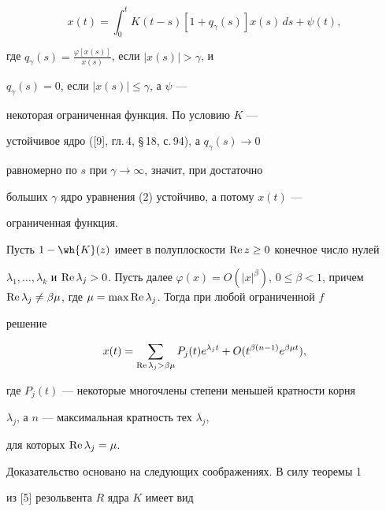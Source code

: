 \begin{equation}


x(t)=\int_0^t K(t-s) [ 1+q_\gamma (s) ] x(s)\,ds + \psi (t),


\end{equation}


где $q_\gamma (s) = \frac{\varphi[x(s)]}{x(s)}$, если $|x(s)| > \gamma$, и


$q_\gamma (s)=0$, если $|x(s)| \le \gamma$, а $\psi$ ---


некоторая ограниченная функция. По условию $K$ ---


устойчивое ядро ([9], гл.\,4, \S\,18, с.\,94), а $q_\gamma (s) \to 0$


равномерно по $s$ при $\gamma \to \infty$, значит, при достаточно


больших $\gamma$ ядро уравнения (2) устойчиво, а потому $x(t)$ ---


ограниченная функция.





\begin{thm}


Пусть $1-\wh{K}(z)$ имеет в полуплоскости $\operatorname{Re} z\ge0$ конечное число нулей


$\lambda_1,\dotsc, \lambda_k$ и $\re\lambda_j>0$. Пусть далее $\varphi(x)=


O (|x|^\beta)$, $0 \le \beta < 1$, причем $\re\lambda_j \ne


\beta\mu$, где $\mu=\max \re\lambda_j$. Тогда при любой ограниченной $f$


решение


$$


x(t)=\sum_{\re\lambda_j > \beta \mu} P_j (t) e^{\lambda_j t} + O


(t^{\beta (n-1)} e^{\beta \mu t}),


$$


где $P_j (t)$ --- некоторые многочлены степени меньшей кратности корня


$\lambda_j$, а $n$ --- максимальная кратность тех $\lambda_j$,


для которых $\operatorname{Re}\lambda_j = \mu$.


\end{thm}





Доказательство основано на следующих соображениях. В силу теоремы 1 


из [5] резольвента $R$ ядра $K$ имеет вид


